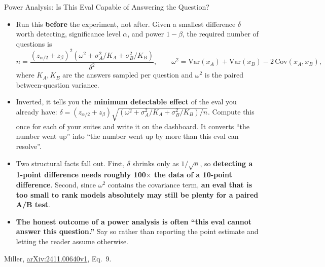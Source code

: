 \begin{frame}{Power Analysis: Is This Eval Capable of Answering the Question?}
  \begin{itemize}\footnotesize\itemsep0.3em
    \item[\textcolor{red}{$\blacktriangleright$}] Run this \textbf{before} the experiment, not after. Given a smallest difference $\delta$ worth detecting, significance level $\alpha$, and power $1-\beta$, the required number of questions is
      \[
        n = \frac{\left(z_{\alpha/2} + z_{\beta}\right)^{2}
              \left(\omega^{2} + \sigma_A^{2}/K_A + \sigma_B^{2}/K_B\right)}{\delta^{2}},
        \qquad
        \omega^{2} = \mathrm{Var}(x_A) + \mathrm{Var}(x_B) - 2\,\mathrm{Cov}(x_A, x_B),
      \]
      where $K_A, K_B$ are the answers sampled per question and $\omega^2$ is the paired between-question variance.
    \item[\textcolor{red}{$\blacktriangleright$}] Inverted, it tells you the \textbf{minimum detectable effect} of the eval you already have:
      $\delta = (z_{\alpha/2} + z_{\beta})\sqrt{(\omega^2 + \sigma_A^2/K_A + \sigma_B^2/K_B)/n}$.
      Compute this once for each of your suites and write it on the dashboard. It converts ``the number went up'' into ``the number went up by more than this eval can resolve''.
    \item[\textcolor{red}{$\blacktriangleright$}] Two structural facts fall out. First, $\delta$ shrinks only as $1/\sqrt{n}$, so \textbf{detecting a 1-point difference needs roughly 100$\times$ the data of a 10-point difference}. Second, since $\omega^2$ contains the covariance term, \textbf{an eval that is too small to rank models absolutely may still be plenty for a paired A/B test}.
    \item[\textcolor{red}{$\blacktriangleright$}] \textbf{The honest outcome of a power analysis is often ``this eval cannot answer this question.''} Say so rather than reporting the point estimate and letting the reader assume otherwise.
  \end{itemize}
  \vspace{0.1em}
  {\scriptsize Miller, \href{https://arxiv.org/abs/2411.00640v1}{arXiv:2411.00640v1}, Eq.~9.}
\end{frame}

